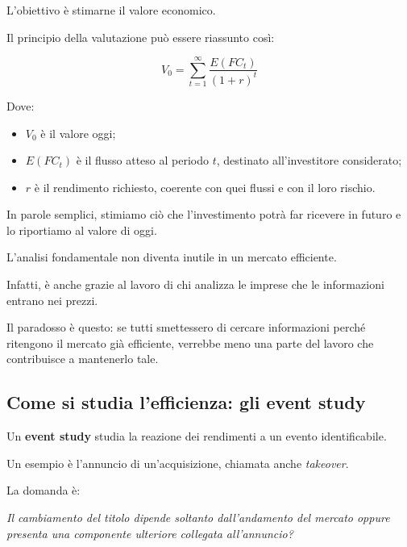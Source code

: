 \noindent L'obiettivo è stimarne
il valore economico.

\medskip

\noindent Il principio della valutazione
può essere riassunto così:

\[
\boxed{
V_0=
\sum_{t=1}^{\infty}
\frac{E(FC_t)}{(1+r)^t}
}
\]

\noindent Dove:

\begin{itemize}
    \item $V_0$ è il valore oggi;

    \item $E(FC_t)$ è il flusso atteso
    al periodo $t$, destinato
    all'investitore considerato;

    \item $r$ è il rendimento richiesto,
    coerente con quei flussi e con il loro rischio.
\end{itemize}

\noindent In parole semplici,
stimiamo ciò che l'investimento
potrà far ricevere in futuro
e lo riportiamo al valore di oggi.

\medskip

\noindent L'analisi fondamentale
non diventa inutile in un mercato efficiente.

\noindent Infatti, è anche grazie al lavoro
di chi analizza le imprese
che le informazioni entrano nei prezzi.

\noindent Il paradosso è questo:
se tutti smettessero di cercare informazioni
perché ritengono il mercato già efficiente,
verrebbe meno una parte del lavoro
che contribuisce a mantenerlo tale.


\subsection{Come si studia l'efficienza: gli event study}

\noindent Un \textbf{event study}
studia la reazione dei rendimenti
a un evento identificabile.

\noindent Un esempio è l'annuncio
di un'acquisizione, chiamata anche
\textit{takeover}.

\medskip

\noindent La domanda è:

\begin{center}
    \textit{Il cambiamento del titolo dipende
    soltanto dall'andamento del mercato
    oppure presenta una componente ulteriore
    collegata all'annuncio?}
\end{center}


